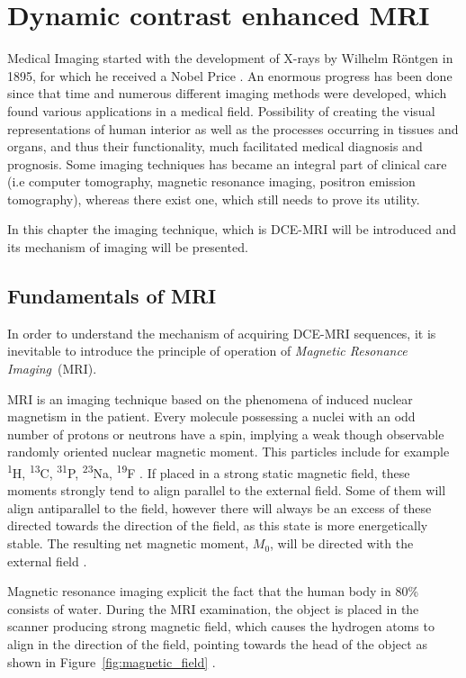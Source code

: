 \chapter{Dynamic contrast enhanced MRI}
	
Medical Imaging started with the development of X-rays by Wilhelm Röntgen in 1895, for which he received a Nobel Price \cite{rontgen1896new}. 
An enormous progress has been done since that time and numerous different imaging methods were developed, which found various applications in a medical field. Possibility of creating the visual representations of human interior as well as the processes occurring in tissues and organs, and thus their functionality, much facilitated medical diagnosis and prognosis.   
Some imaging techniques has became an integral part of clinical care (i.e computer tomography, magnetic resonance imaging, positron emission tomography), whereas there exist one, which still needs to prove its utility. 

In this chapter the imaging technique, which is DCE-MRI will be introduced and its mechanism of imaging will be presented.

\section{Fundamentals of MRI}
In order to understand the mechanism of acquiring DCE-MRI sequences, it is inevitable to introduce the principle of operation of \textit{Magnetic Resonance Imaging}~(MRI).

MRI is an imaging technique based on the phenomena of induced nuclear  magnetism in the patient. Every molecule possessing a nuclei with an odd number of protons or neutrons  have a spin, implying a weak though observable randomly oriented nuclear magnetic moment. 
This particles include for example \textsuperscript{1}H, \textsuperscript{13}C, \textsuperscript{31}P, \textsuperscript{23}Na, \textsuperscript{19}F \nocite{bronzino1999biomedical}\cite{biomedical_hanbook_imaging, grover2015magnetic}. If placed in a strong static magnetic field, these moments strongly tend to align parallel to the external field. Some of them will align antiparallel to the field, however there will always be an excess of these directed towards the direction of the field, as this state is more energetically stable. The resulting net magnetic moment, $M_0$, will be directed with the external field \cite{bushong2014magnetic}.

Magnetic resonance imaging explicit the fact that the human body in 80\% consists of water. During the MRI examination, the object is placed in the scanner producing strong magnetic field, which causes the hydrogen atoms to align in the direction of the field, pointing towards the head of the object as shown in Figure~\ref{fig:magnetic_field} \cite{bushong2014magnetic}. 

